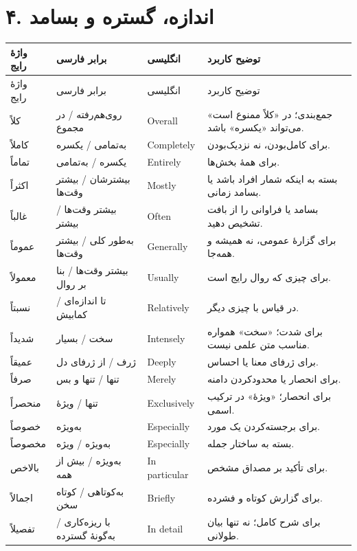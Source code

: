 \section*{۴. اندازه، گستره و بسامد}
\begingroup
\small
\setlength{\tabcolsep}{4pt}
\renewcommand{\arraystretch}{1.3}
\begin{longtable}{|p{2.5cm}|p{4.0cm}|p{2.3cm}|p{5.3cm}|}
\hline
واژهٔ رایج & برابر فارسی & انگلیسی & توضیح کاربرد \\
\hline
\endfirsthead
\hline
واژهٔ رایج & برابر فارسی & انگلیسی & توضیح کاربرد \\
\hline
\endhead

کلاً & روی‌هم‌رفته / در مجموع & \textenglish{Overall} & جمع‌بندی؛ در «کلاً ممنوع است» می‌تواند «یکسره» باشد. \\
\hline
کاملاً & به‌تمامی / یکسره & \textenglish{Completely} & برای کامل‌بودن، نه نزدیک‌بودن. \\
\hline
تماماً & یکسره / به‌تمامی & \textenglish{Entirely} & برای همهٔ بخش‌ها. \\
\hline
اکثراً & بیشترشان / بیشتر وقت‌ها & \textenglish{Mostly} & بسته به اینکه شمار افراد باشد یا بسامد زمانی. \\
\hline
غالباً & بیشتر وقت‌ها / بیشتر & \textenglish{Often} & بسامد یا فراوانی را از بافت تشخیص دهید. \\
\hline
عموماً & به‌طور کلی / بیشتر وقت‌ها & \textenglish{Generally} & برای گزارهٔ عمومی، نه همیشه و همه‌جا. \\
\hline
معمولاً & بیشتر وقت‌ها / بنا بر روال & \textenglish{Usually} & برای چیزی که روال رایج است. \\
\hline
نسبتاً & تا اندازه‌ای / کمابیش & \textenglish{Relatively} & در قیاس با چیزی دیگر. \\
\hline
شدیداً & سخت / بسیار & \textenglish{Intensely} & برای شدت؛ «سخت» همواره مناسب متن علمی نیست. \\
\hline
عمیقاً & ژرف / از ژرفای دل & \textenglish{Deeply} & برای ژرفای معنا یا احساس. \\
\hline
صرفاً & تنها / تنها و بس & \textenglish{Merely} & برای انحصار یا محدودکردن دامنه. \\
\hline
منحصراً & تنها / ویژهٔ & \textenglish{Exclusively} & برای انحصار؛ «ویژهٔ» در ترکیب اسمی. \\
\hline
خصوصاً & به‌ویژه & \textenglish{Especially} & برای برجسته‌کردن یک مورد. \\
\hline
مخصوصاً & به‌ویژه / ویژه & \textenglish{Especially} & بسته به ساختار جمله. \\
\hline
بالاخص & به‌ویژه / بیش از همه & \textenglish{In particular} & برای تأکید بر مصداق مشخص. \\
\hline
اجمالاً & به‌کوتاهی / کوتاه سخن & \textenglish{Briefly} & برای گزارش کوتاه و فشرده. \\
\hline
تفصیلاً & با ریزه‌کاری / به‌گونهٔ گسترده & \textenglish{In detail} & برای شرح کامل؛ نه تنها بیان طولانی. \\
\hline
\end{longtable}
\endgroup



